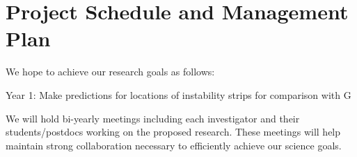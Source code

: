 \section{Project Schedule and Management Plan}

We hope to achieve our research goals as follows:

Year 1: Make predictions for locations of instability strips for comparison with G 

We will  hold bi-yearly meetings including each investigator and their students/postdocs working on the proposed research. These meetings will help maintain strong collaboration necessary to efficiently achieve our science goals.
